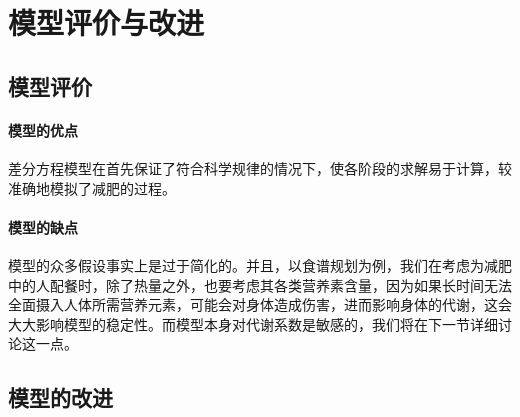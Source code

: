\documentclass[a4paper,12pt,onecolumn,twoside]{article}
\begin{document}
\section{模型评价与改进}
\subsection{模型评价}
\paragraph{模型的优点}差分方程模型在首先保证了符合科学规律的情况下，使各阶段的求解易于计算，较准确地模拟了减肥的过程。
\paragraph{模型的缺点}模型的众多假设事实上是过于简化的。并且，以食谱规划为例，我们在考虑为减肥中的人配餐时，除了热量之外，也要考虑其各类营养素含量，因为如果长时间无法全面摄入人体所需营养元素，可能会对身体造成伤害，进而影响身体的代谢，这会大大影响模型的稳定性。而模型本身对代谢系数是敏感的，我们将在下一节详细讨论这一点。
\subsection{模型的改进}
\end{document}
